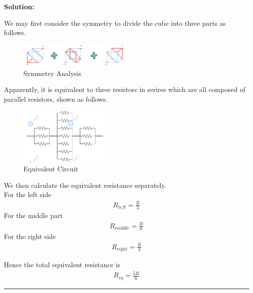 \documentclass[a4paper, 11pt]{article}
\newenvironment{solution}
    {\textbf{Solution:}}
    {}
\begin{document}
\begin{solution}
	\par We may first consider the symmetry to divide the cube into three parts as follows.
	\begin{figure}[!htbp]
		\centering
		\includegraphics[width=0.5\textwidth]{hw5_p3_analysis.png}
		\caption{Symmetry Analysis}
	\end{figure}

	Apparently, it is equivalent to three resistors in serires which are all composed of parallel resistors, shown as follows.
	\begin{figure}[!htbp]
		\centering
		\includegraphics[width=0.4\textwidth]{hw5_p3_circuit.png}
		\caption{Equivalent Circuit}
	\end{figure}

	We then calculate the equivalent resistance separately. \\
	For the left side
	\begin{align*}
		R_{left} = \frac{R}{3}
	\end{align*}
	For the middle part
	\begin{align*}
		R_{middle} = \frac{R}{6}
	\end{align*}
	For the right side
	\begin{align*}
		R_{right} = \frac{R}{3}
	\end{align*}

	Hence the total equivalent resistance is
	\begin{align}
		R_{eq} = \frac{5R}{6}
	\end{align}
\end{solution}

\noindent\rule{7.1in}{2.8pt}
\end{document}
